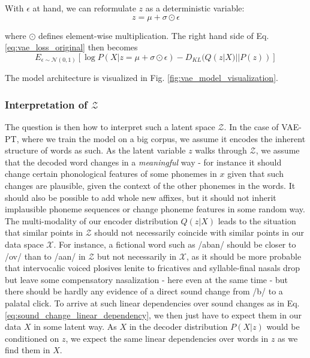 \documentclass[6pt]{article}
\begin{document}
With $\epsilon$ at hand, we can reformulate $z$ as a deterministic variable:
\begin{equation}
z = \mu + \sigma \odot \epsilon
\end{equation}

where $\odot$ defines element-wise multiplication.
The right hand side of Eq. \ref{eq:vae_loss_original} then becomes
\begin{equation}
\label{eq:vae_loss_reparameterized}
E_{\epsilon \sim \mathcal{N}(0,1)}[\log P(X|z= \mu + \sigma \odot \epsilon) - D_{KL}(Q(z|X)||P(z))] 
\end{equation}

The model architecture is visualized in Fig. \ref{fig:vae_model_visualization}. 




\subsubsection{Interpretation of $\mathcal{Z}$}

The question is then how to interpret such a latent space $\mathcal{Z}$. In the case of VAE-PT, where we train the model on a big corpus, we assume it encodes the inherent structure of words as such. As the latent variable $z$ walks through $\mathcal{Z}$, we assume that the decoded word changes in a \textit{meaningful} way - for instance it should change certain phonological features of some phonemes in $x$ given that such changes are plausible, given the context of the other phonemes in the words. It should also be possible to add whole new affixes, but it should not inherit implausible phoneme sequences or change phoneme features in some random way. The multi-modality of our encoder distribution $Q(z|X)$ leads to the situation that similar points in $\mathcal{Z}$ should not necessarily coincide with similar points in our data space $\mathcal{X}$. For instance, a fictional word such as /aban/ should be closer to /ov/ than to /a\textipa{\textdoublebarpipe}an/ in $\mathcal{Z}$ but not necessarily in $\mathcal{X}$, as it should be more probable that intervocalic voiced plosives lenite to fricatives and syllable-final nasals drop but leave some compensatory nasalization - here even at the same time - but there should be hardly any evidence of a direct sound change from /b/ to a palatal click. To arrive at such linear dependencies over sound changes as in Eq. \ref{eq:sound_change_linear_dependency}, we then just have to expect them in our data $X$ in some latent way. As $X$ in the decoder distribution $P(X|z)$ would be conditioned on $z$, we expect the same linear dependencies over words in $z$ as we find them in $X$.
\end{document}
